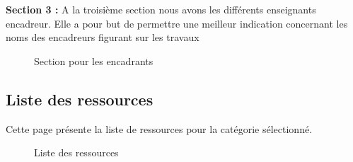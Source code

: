 \textbf{Section 3 :}
A la troisième section nous avons les différents enseignants encadreur. Elle a pour but de permettre une meilleur indication concernant les noms des encadreurs figurant sur les travaux

\begin{figure}[H]%
    \center%
    \setlength{\fboxsep}{5pt}%
    \setlength{\fboxrule}{0.5pt}%
    \caption{Section pour les encadrants}%
\end{figure}
\par


\subsection{Liste des ressources}
Cette page présente la liste de ressources pour la catégorie sélectionné.

\begin{figure}[H]%
    \center%
    \setlength{\fboxsep}{5pt}%
    \setlength{\fboxrule}{0.5pt}%
    \caption{Liste des ressources}%
\end{figure}


